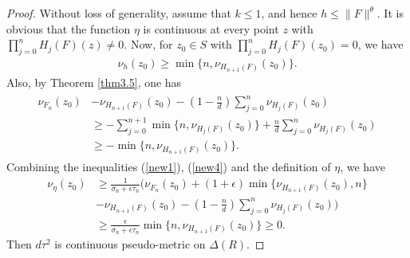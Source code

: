 \documentclass[12pt,article]{amsart}
\numberwithin{equation}{section}
\begin{document}
\begin{proof}
Without loss of generality, assume that $k\le 1$, and hence $h\le \|F\|^\theta$. It is obvious that the function $\eta$ is continuous at every point $z$ with $\prod_{j=0}^nH_j(F)(z)\ne 0$. Now, for $z_0\in S$ with $\prod_{j=0}^nH_j(F)(z_0)= 0$, we have
\begin{align}\label{new1}
\nu_{h}(z_0)\ge \min\{n,\nu_{H_{n+1}(F)}(z_0)\}.
\end{align}
Also, by Theorem \ref{thm3.5}, one has
\begin{align}\label{new4}
\begin{split}
\nu_{F_n}(z_0)&-\nu_{H_{n+1}(F)}(z_0)-(1-\frac{n}{d})\sum_{j=0}^n\nu_{H_j(F)}(z_0)\\
&\ge -\sum_{j=0}^{n+1}\min\{n,\nu_{H_j(F)}(z_0)\}+\frac{n}{d}\sum_{j=0}^n\nu_{H_j(F)}(z_0)\\
&\ge  -\min\{n,\nu_{H_{n+1}(F)}(z_0)\}.
\end{split}
\end{align}
Combining the inequalities (\ref{new1}), (\ref{new4}) and the definition of $\eta$, we have
\begin{align*}
\nu_{\eta}(z_0)&\ge \frac{1}{\sigma_n+\epsilon\tau_n}\biggl (\nu_{F_n}(z_0)+(1+\epsilon)\min\{\nu_{H_{n+1}(F)}(z_0),n\}\\
&-\nu_{H_{n+1}(F)}(z_0)-(1-\frac{n}{d})\sum_{j=0}^n\nu_{H_j(F)}(z_0)\biggl)\\
&\ge\frac{\epsilon}{\sigma_n+\epsilon\tau_n}\min\{n,\nu_{H_{n+1}(F)}(z_0)\}\ge 0.
\end{align*}
Then $d\tau^2$ is continuous pseudo-metric on $\Delta(R)$. 


\end{proof}
\end{document}
